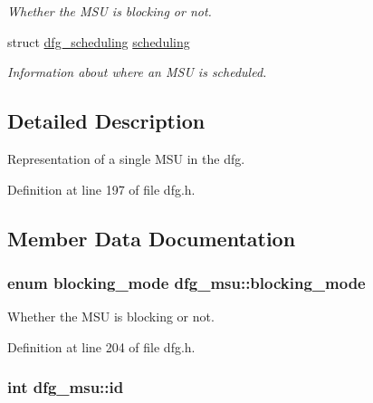 \begin{DoxyCompactItemize}
\begin{DoxyCompactList}\small\item\em Whether the M\-S\-U is blocking or not. \end{DoxyCompactList}\item 
struct \hyperlink{structdfg__scheduling}{dfg\-\_\-scheduling} \hyperlink{structdfg__msu_a4ca8d344a0d4c4cf72b8a045eb3d3d61}{scheduling}
\begin{DoxyCompactList}\small\item\em Information about where an M\-S\-U is scheduled. \end{DoxyCompactList}\end{DoxyCompactItemize}


\subsection{Detailed Description}
Representation of a single M\-S\-U in the dfg. 

Definition at line 197 of file dfg.\-h.



\subsection{Member Data Documentation}
\hypertarget{structdfg__msu_a9d0a919e5c719537d9d404f0e1de785a}{
\subsubsection[{blocking\-\_\-mode}]{\setlength{\rightskip}{0pt plus 5cm}enum {\bf blocking\-\_\-mode} dfg\-\_\-msu\-::blocking\-\_\-mode}}\label{structdfg__msu_a9d0a919e5c719537d9d404f0e1de785a}


Whether the M\-S\-U is blocking or not. 



Definition at line 204 of file dfg.\-h.

\hypertarget{structdfg__msu_a6ff9496252821697e69b9802f8d96919}{
\subsubsection[{id}]{\setlength{\rightskip}{0pt plus 5cm}int dfg\-\_\-msu\-::id}}\label{structdfg__msu_a6ff9496252821697e69b9802f8d96919}


